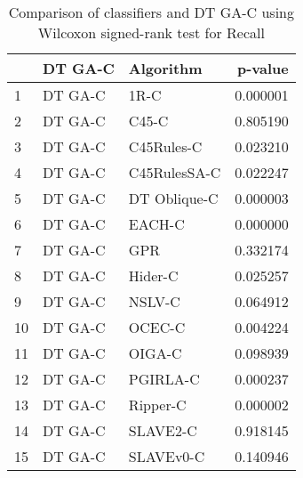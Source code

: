 \begin{table}
\footnotesize
\caption{Comparison of classifiers and DT GA-C using Wilcoxon signed-rank test for Recall}
\label{tab:DT GA-C wilcoxon Recall comparison}
\begin{tabular}{lllr}
\hline
 & DT GA-C & Algorithm & p-value \\
\hline
1 & DT GA-C & 1R-C & 0.000001 \\
2 & DT GA-C & C45-C & 0.805190 \\
3 & DT GA-C & C45Rules-C & 0.023210 \\
4 & DT GA-C & C45RulesSA-C & 0.022247 \\
5 & DT GA-C & DT Oblique-C & 0.000003 \\
6 & DT GA-C & EACH-C & 0.000000 \\
7 & DT GA-C & GPR & 0.332174 \\
8 & DT GA-C & Hider-C & 0.025257 \\
9 & DT GA-C & NSLV-C & 0.064912 \\
10 & DT GA-C & OCEC-C & 0.004224 \\
11 & DT GA-C & OIGA-C & 0.098939 \\
12 & DT GA-C & PGIRLA-C & 0.000237 \\
13 & DT GA-C & Ripper-C & 0.000002 \\
14 & DT GA-C & SLAVE2-C & 0.918145 \\
15 & DT GA-C & SLAVEv0-C & 0.140946 \\
\hline
\end{tabular}
\end{table}
